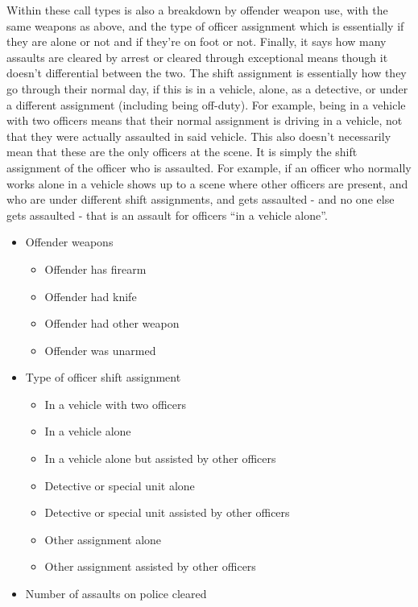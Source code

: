 \documentclass[
  12pt,
  openany]{book}
\providecommand{\tightlist}{%
  \setlength{\itemsep}{0pt}\setlength{\parskip}{0pt}}
\begin{document}
Within these call types is also a breakdown by offender weapon use, with the same weapons as above, and the type of officer assignment which is essentially if they are alone or not and if they're on foot or not. Finally, it says how many assaults are cleared by arrest or cleared through exceptional means though it doesn't differential between the two. The shift assignment is essentially how they go through their normal day, if this is in a vehicle, alone, as a detective, or under a different assignment (including being off-duty). For example, being in a vehicle with two officers means that their normal assignment is driving in a vehicle, not that they were actually assaulted in said vehicle. This also doesn't necessarily mean that these are the only officers at the scene. It is simply the shift assignment of the officer who is assaulted. For example, if an officer who normally works alone in a vehicle shows up to a scene where other officers are present, and who are under different shift assignments, and gets assaulted - and no one else gets assaulted - that is an assault for officers ``in a vehicle alone''.

\begin{itemize}
\tightlist
\item
  Offender weapons

  \begin{itemize}
  \tightlist
  \item
    Offender has firearm
  \item
    Offender had knife
  \item
    Offender had other weapon
  \item
    Offender was unarmed
  \end{itemize}
\item
  Type of officer shift assignment

  \begin{itemize}
  \tightlist
  \item
    In a vehicle with two officers
  \item
    In a vehicle alone
  \item
    In a vehicle alone but assisted by other officers
  \item
    Detective or special unit alone
  \item
    Detective or special unit assisted by other officers
  \item
    Other assignment alone
  \item
    Other assignment assisted by other officers
  \end{itemize}
\item
  Number of assaults on police cleared
\end{itemize}
\end{document}
